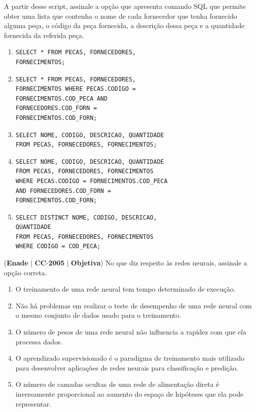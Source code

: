 \documentclass{exam}
\begin{document}
\begin{questions}
A partir desse script, assinale a opção que apresenta comando
SQL que permite obter uma lista que contenha o nome de cada
fornecedor que tenha fornecido alguma peça, o código da peça
fornecida, a descrição dessa peça e a quantidade fornecida da
referida peça.

	\begin{enumerate}[label=\alph*)]
		\item  
\begin{verbatim}
SELECT * FROM PECAS, FORNECEDORES,
FORNECIMENTOS;
\end{verbatim} 
		\item  
\begin{verbatim}
SELECT * FROM PECAS, FORNECEDORES,
FORNECIMENTOS WHERE PECAS.CODIGO =
FORNECIMENTOS.COD_PECA AND
FORNECEDORES.COD_FORN =
FORNECIMENTOS.COD_FORN; 
\end{verbatim} 
		\item  
\begin{verbatim}
SELECT NOME, CODIGO, DESCRICAO, QUANTIDADE
FROM PECAS, FORNECEDORES, FORNECIMENTOS;
\end{verbatim} 
		\item  
\begin{verbatim}
SELECT NOME, CODIGO, DESCRICAO, QUANTIDADE
FROM PECAS, FORNECEDORES, FORNECIMENTOS
WHERE PECAS.CODIGO = FORNECIMENTOS.COD_PECA
AND FORNECEDORES.COD_FORN =
FORNECIMENTOS.COD_FORN; 
\end{verbatim} 
		\item  
\begin{verbatim}
SELECT DISTINCT NOME, CODIGO, DESCRICAO,
QUANTIDADE
FROM PECAS, FORNECEDORES, FORNECIMENTOS
WHERE CODIGO = COD_PECA;
\end{verbatim} 
	\end{enumerate}

\question (\textbf{Enade} $|$ \textbf{CC}-\textbf{2005} $|$ \textbf{Objetiva})
No que diz respeito às redes neurais, assinale a opção correta.
	\begin{enumerate}[label=\alph*)]
		\item  O treinamento de uma rede neural tem tempo determinado de
execução.
		\item  Não há problemas em realizar o teste de desempenho de uma
rede neural com o mesmo conjunto de dados usado para o
treinamento.
		\item  O número de pesos de uma rede neural não influencia a
rapidez com que ela processa dados.
		\item  O aprendizado supervisionado é o paradigma de treinamento
mais utilizado para desenvolver aplicações de redes neurais
para classificação e predição.
		\item  O número de camadas ocultas de uma rede de alimentação
direta é inversamente proporcional ao aumento do espaço de
hipóteses que ela pode representar.
	\end{enumerate}


\end{questions}
\end{document}
